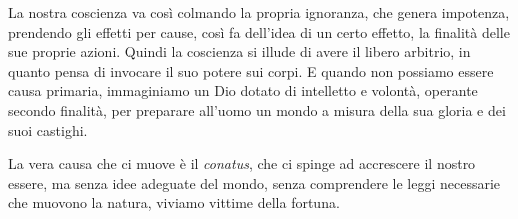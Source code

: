 La nostra coscienza va così colmando la propria ignoranza, che genera impotenza, prendendo gli effetti per cause, così fa dell'idea di un certo effetto, la finalità delle sue proprie azioni. Quindi la coscienza si illude di avere il libero arbitrio, in quanto pensa di invocare il suo potere sui corpi. E quando non possiamo essere causa primaria, immaginiamo un Dio dotato di intelletto e volontà, operante secondo finalità, per preparare all'uomo un mondo a misura della sua gloria e dei suoi castighi.

La vera causa che ci muove è il \textit{conatus}, che ci spinge ad accrescere il nostro essere, ma senza idee adeguate del mondo, senza comprendere le leggi necessarie che muovono la natura, viviamo vittime della fortuna.